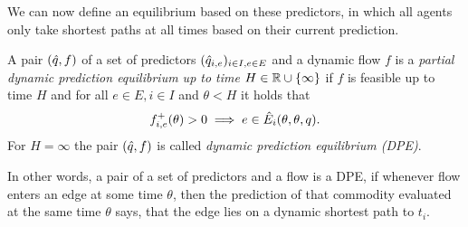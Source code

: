 We can now define an equilibrium based on these predictors, in which all agents only take shortest paths at all times based on their current prediction.
\begin{definition}
    A pair $(\hat q, f)$ of a set of predictors $(\hat q_{i,e})_{i\in I, e\in E}$ and a dynamic flow $f$ is a \emph{partial dynamic prediction equilibrium up to time $H\in\mathbb{R}\cup\{\infty\}$} if $f$ is feasible up to time $H$ and for all $e\in E, i\in I$ and $\theta < H$ it holds that
    \[
        {f}^+_{i,e}(\theta) > 0 \implies e \in \hat E_i(\theta, \theta, q).
    \]
    For $H = \infty$ the pair $(\hat q, f)$ is called \emph{dynamic prediction equilibrium (DPE)}. 
\end{definition}

In other words, a pair of a set of predictors and a flow is a DPE, if whenever flow enters an edge at some time $\theta$, then the prediction of that commodity evaluated at the same time $\theta$ says, that the edge lies on a dynamic shortest path to $t_i$.

